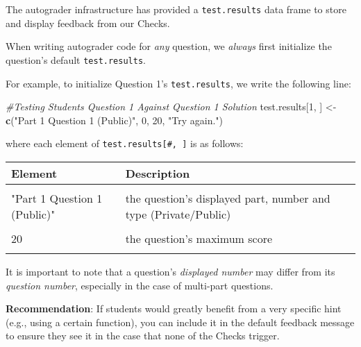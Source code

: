 \documentclass[
  12pt,
]{book}
\newenvironment{Shaded}{\begin{snugshade}}{\end{snugshade}}
\newcommand{\CommentTok}[1]{\textcolor[rgb]{0.56,0.35,0.01}{\textit{#1}}}
\newcommand{\DecValTok}[1]{\textcolor[rgb]{0.00,0.00,0.81}{#1}}
\newcommand{\FunctionTok}[1]{\textcolor[rgb]{0.13,0.29,0.53}{\textbf{#1}}}
\newcommand{\NormalTok}[1]{#1}
\newcommand{\OtherTok}[1]{\textcolor[rgb]{0.56,0.35,0.01}{#1}}
\newcommand{\StringTok}[1]{\textcolor[rgb]{0.31,0.60,0.02}{#1}}
\begin{document}
The autograder infrastructure has provided a \texttt{test.results} data frame to store and display feedback from our Checks.

When writing autograder code for \emph{any} question, we \emph{always} first initialize the question's default \texttt{test.results}.

For example, to initialize Question 1's \texttt{test.results}, we write the following line:

\begin{Shaded}
\begin{Highlighting}[]
\CommentTok{\#Testing Student\textquotesingle{}s Question 1 Against Question 1 Solution}
\NormalTok{test.results[}\DecValTok{1}\NormalTok{, ] }\OtherTok{\textless{}{-}} \FunctionTok{c}\NormalTok{(}\StringTok{"Part 1 Question 1 (Public)"}\NormalTok{, }\DecValTok{0}\NormalTok{, }\DecValTok{20}\NormalTok{, }\StringTok{"Try again."}\NormalTok{)}
\end{Highlighting}
\end{Shaded}

where each element of \texttt{test.results{[}\#,\ {]}} is as follows:

\renewcommand{\arraystretch}{2}

\begin{longtable}{ll}
\toprule
\textbf{Element} & \textbf{Description}\\
\midrule
\cellcolor{gray!10}{1} & \cellcolor{gray!10}{the question's number}\\
\hline
"Part 1 Question 1 (Public)" & the question's displayed part, number and type (Private/Public)\\
\hline
\cellcolor{gray!10}{0} & \cellcolor{gray!10}{the question's default score}\\
\hline
20 & the question's maximum score\\
\hline
\cellcolor{gray!10}{"Try again."} & \cellcolor{gray!10}{the default feedback message}\\
\bottomrule
\end{longtable}

It is important to note that a question's \emph{displayed number} may differ from its \emph{question number}, especially in the case of multi-part questions.

\textbf{Recommendation}: If students would greatly benefit from a very specific hint (e.g., using a certain function), you can include it in the default feedback message to ensure they see it in the case that none of the Checks trigger.
\end{document}
